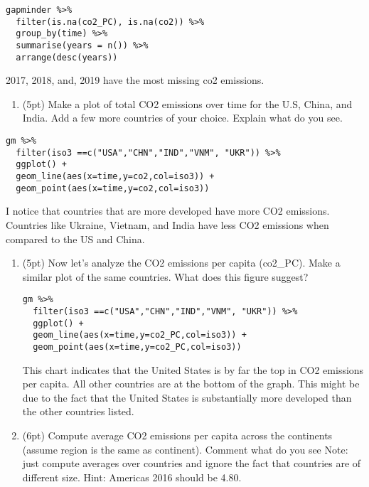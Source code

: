 \documentclass[]{article}
\providecommand{\tightlist}{%
  \setlength{\itemsep}{0pt}\setlength{\parskip}{0pt}}
\begin{document}
\begin{verbatim}
gapminder %>% 
  filter(is.na(co2_PC), is.na(co2)) %>% 
  group_by(time) %>% 
  summarise(years = n()) %>% 
  arrange(desc(years))
\end{verbatim}

2017, 2018, and, 2019 have the most missing co2 emissions.

\begin{enumerate}
\def\labelenumi{\arabic{enumi}.}
\setcounter{enumi}{1}
\tightlist
\item
  (5pt) Make a plot of total CO2 emissions over time for the U.S, China,
  and India. Add a few more countries of your choice. Explain what do
  you see.
\end{enumerate}

\begin{verbatim}
gm %>% 
  filter(iso3 ==c("USA","CHN","IND","VNM", "UKR")) %>% 
  ggplot() +
  geom_line(aes(x=time,y=co2,col=iso3)) +
  geom_point(aes(x=time,y=co2,col=iso3))
\end{verbatim}

I notice that countries that are more developed have more CO2 emissions.
Countries like Ukraine, Vietnam, and India have less CO2 emissions when
compared to the US and China.

\begin{enumerate}
\def\labelenumi{\arabic{enumi}.}
\setcounter{enumi}{2}
\item
  (5pt) Now let's analyze the CO2 emissions per capita (co2\_PC). Make a
  similar plot of the same countries. What does this figure suggest?

\begin{verbatim}
gm %>% 
  filter(iso3 ==c("USA","CHN","IND","VNM", "UKR")) %>% 
  ggplot() +
  geom_line(aes(x=time,y=co2_PC,col=iso3)) +
  geom_point(aes(x=time,y=co2_PC,col=iso3))
\end{verbatim}

  This chart indicates that the United States is by far the top in CO2
  emissions per capita. All other countries are at the bottom of the
  graph. This might be due to the fact that the United States is
  substantially more developed than the other countries listed.
\item
  (6pt) Compute average CO2 emissions per capita across the continents
  (assume region is the same as continent). Comment what do you see
  Note: just compute averages over countries and ignore the fact that
  countries are of different size. Hint: Americas 2016 should be 4.80.
\end{enumerate}
\end{document}
